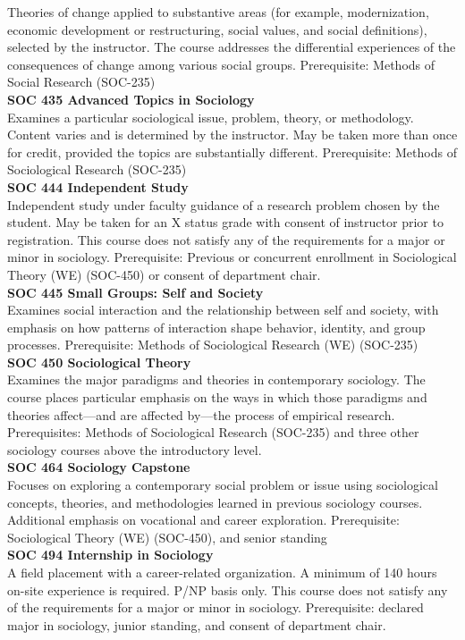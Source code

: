 \documentclass[
  letterpaper,
]{scrbook}
\begin{document}
Theories of change applied to substantive areas (for example,
modernization, economic development or restructuring, social values, and
social definitions), selected by the instructor. The course addresses
the differential experiences of the consequences of change among various
social groups. Prerequisite: Methods of Social Research (SOC-235)\\
\textbf{SOC 435 Advanced Topics in Sociology}\\
Examines a particular sociological issue, problem, theory, or
methodology. Content varies and is determined by the instructor. May be
taken more than once for credit, provided the topics are substantially
different. Prerequisite: Methods of Sociological Research (SOC-235)\\
\textbf{SOC 444 Independent Study}\\
Independent study under faculty guidance of a research problem chosen by
the student. May be taken for an X status grade with consent of
instructor prior to registration. This course does not satisfy any of
the requirements for a major or minor in sociology. Prerequisite:
Previous or concurrent enrollment in Sociological Theory (WE) (SOC-450)
or consent of department chair.\\
\textbf{SOC 445 Small Groups: Self and Society}\\
Examines social interaction and the relationship between self and
society, with emphasis on how patterns of interaction shape behavior,
identity, and group processes. Prerequisite: Methods of Sociological
Research (WE) (SOC-235)\\
\textbf{SOC 450 Sociological Theory}\\
Examines the major paradigms and theories in contemporary sociology. The
course places particular emphasis on the ways in which those paradigms
and theories affect---and are affected by---the process of empirical
research. Prerequisites: Methods of Sociological Research (SOC-235) and
three other sociology courses above the introductory level.\\
\textbf{SOC 464 Sociology Capstone}\\
Focuses on exploring a contemporary social problem or issue using
sociological concepts, theories, and methodologies learned in previous
sociology courses. Additional emphasis on vocational and career
exploration. Prerequisite: Sociological Theory (WE) (SOC-450), and
senior standing\\
\textbf{SOC 494 Internship in Sociology}\\
A field placement with a career-related organization. A minimum of 140
hours on-site experience is required. P/NP basis only. This course does
not satisfy any of the requirements for a major or minor in sociology.
Prerequisite: declared major in sociology, junior standing, and consent
of department chair.
\end{document}
